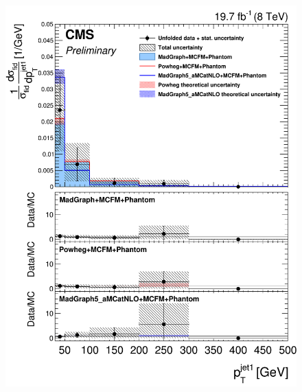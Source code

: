 \begin{figure}[hbtp]
\begin{center}
    \includegraphics[width=\cmsFigWidth]{Figures/DiffCrossSecZZTo4ePtJet1_Unfolded_fr_MadGraph_norm.png}     

\end{center}
\end{figure}
